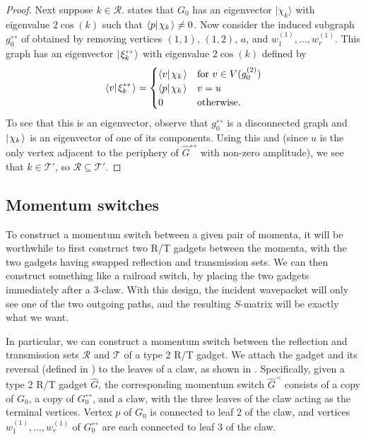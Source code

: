 \documentclass[../thesis-main/thesis-main]{subfiles}
\begin{document}
\begin{proof}
Next suppose $k\in \mathcal{R}$.  states that $G_0$ has an eigenvector $|\chi_k\rangle$ with eigenvalue $2\cos(k)$ such that $\langle p |\mspace{2mu} \chi_k \mspace{2mu} \rangle \neq 0$.  Now consider the induced subgraph $g_0^{\leftrightarrow}$ of  obtained by removing vertices $(1,1)$, $(1,2)$, $a$, and $w^{(1)}_1,\ldots,w^{(1)}_{r}$. This graph has an eigenvector $|\mspace{2mu} \xi^{\leftrightarrow}_k \mspace{2mu} \rangle$ with eigenvalue $2\cos(k)$ defined by
\begin{equation}
  \langle v |\mspace{2mu} \xi^{\leftrightarrow}_k \mspace{2mu} \rangle = \begin{cases} \langle{v}|\mspace{2mu} \chi_k \mspace{2mu} \rangle& \text{for }v\in V(g_0^{(2)}) \\
    \langle{p}|\mspace{2mu} \chi_k \mspace{2mu} \rangle & v = u\\
0 &\text{otherwise.} \end{cases}
\end{equation}
To see that this is an eigenvector, observe that $g_0^{\leftrightarrow}$ is a disconnected graph and $|\mspace{2mu} \chi_k \mspace{2mu} \rangle$ is an eigenvector of one of its components.  Using this and  (since $u$ is the only vertex adjacent to the periphery of $\hat{G}^{\leftrightarrow}$ with non-zero amplitude), we see that $k\in \mathcal{T}'$, so $\mathcal{R} \subseteq \mathcal{T}'$.
\end{proof}



\subsection{Momentum switches}\label{sec:mom_switch}

To construct a momentum switch between a given pair of momenta, it will be worthwhile to first construct two R/T gadgets between the momenta, with the two gadgets having swapped reflection and transmission sets.  We can then construct something like a railroad switch, by placing the two gadgets immediately after a 3-claw.  With this design, the incident wavepacket will only see one of the two outgoing paths, and the resulting $S$-matrix will be exactly what we want.

In particular, we can construct a momentum switch between the reflection and transmission sets $\mathcal{R}$ and $\mathcal{T}$ of a type 2 R/T gadget.  We attach the gadget and its reversal (defined in ) to the leaves of a claw, as shown in .  Specifically, given a type 2 R/T gadget $\widehat{G}$, the corresponding momentum switch $\widehat{G}^{\prec}$ consists of a copy of $G_0$, a copy of $G_{0}^{\leftrightarrow}$, and a claw, with the three leaves of the claw acting as the terminal vertices.  Vertex $p$ of $G_0$ is connected to leaf $2$ of the claw, and vertices $w_1^{(1)},\ldots,w_r^{(1)}$ of $G_{0}^{\leftrightarrow}$ are each connected to leaf $3$ of the claw.
\end{document}
